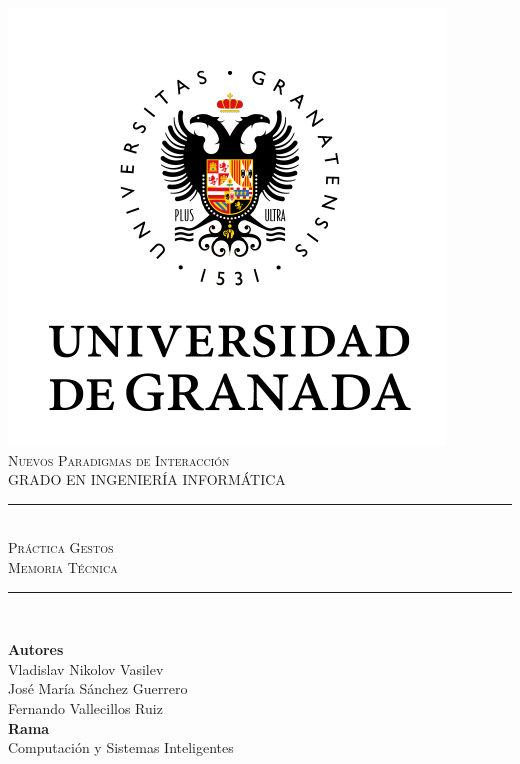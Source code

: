 \documentclass[11pt,a4paper]{article}
\newcommand{\asignatura}{Nuevos Paradigmas de Interacción}
\newcommand{\autorv}{Vladislav Nikolov Vasilev}
\newcommand{\autorj}{José María Sánchez Guerrero}
\newcommand{\autorf}{Fernando Vallecillos Ruiz}
\newcommand{\titulo}{Práctica Gestos}
\newcommand{\subtitulo}{Memoria Técnica}
\begin{document}

\begin{titlepage}

\begin{minipage}{\textwidth}

\centering

\includegraphics[scale=0.5]{img/ugr.png}\\

\textsc{\Large \asignatura{}\\[0.2cm]}
\textsc{GRADO EN INGENIERÍA INFORMÁTICA}\\[1cm]

\noindent\rule[-1ex]{\textwidth}{1pt}\\[1.5ex]
\textsc{{\Huge \titulo\\[0.5ex]}}
\textsc{{\Large \subtitulo\\}}
\noindent\rule[-1ex]{\textwidth}{2pt}\\[3.5ex]

\end{minipage}

\vspace{0.5cm}

\begin{minipage}{\textwidth}

\centering

\textbf{Autores}\\ {\autorv{}}\\{\autorj{}}\\{\autorf{}}\\[2.5ex]
\textbf{Rama}\\ {Computación y Sistemas Inteligentes}\\[2.5ex]
\vspace{0.3cm}


\end{minipage}
\end{titlepage}
\end{document}
